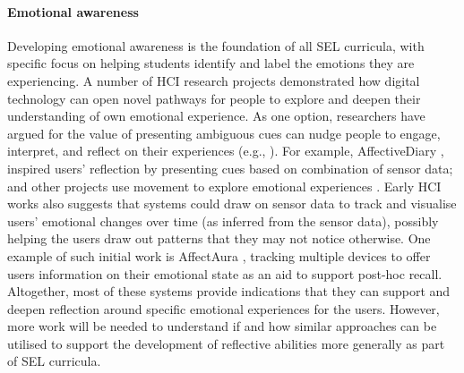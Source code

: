 \documentclass[prodmode,acmtochi]{acmsmall}
\newcommand{\Geraldine}[1]{\textrm{\textbf{\textcolor{Orange}{[[#1]]}}}}
\begin{document}
        \paragraph{Emotional awareness}
        \label{sec:emaware}
Developing emotional awareness is the foundation of all SEL curricula, with specific focus on helping students identify and label the emotions they are experiencing. A number of HCI research projects demonstrated how digital technology can open novel pathways for people to explore and deepen their understanding of own emotional experience. As one option, researchers have argued for the value of presenting ambiguous cues can nudge people to engage, interpret, and reflect on their experiences (e.g., \cite{Boehner2005,Gaver2003}). For example, AffectiveDiary  \cite{Stahl2008,Sengers2007,Hook2008}, inspired users' reflection by presenting cues based on combination of sensor data; and other projects use movement to explore emotional experiences \cite{Mentis2014}. Early HCI works also suggests that systems could draw on sensor data to track and visualise users' emotional changes over time (as inferred from the sensor data), possibly helping the users draw out patterns that they may not notice otherwise. One example of such initial work is AffectAura \cite{McDuff2012}, tracking multiple devices to offer users information on their emotional state as an aid to support post-hoc recall. 
%
Altogether, most of these systems provide indications that they can support and deepen reflection around specific emotional experiences for the users.  However, more work will be needed to understand if and how similar approaches can be utilised to support the development of reflective abilities more generally as part of SEL curricula.

%
\end{document}
